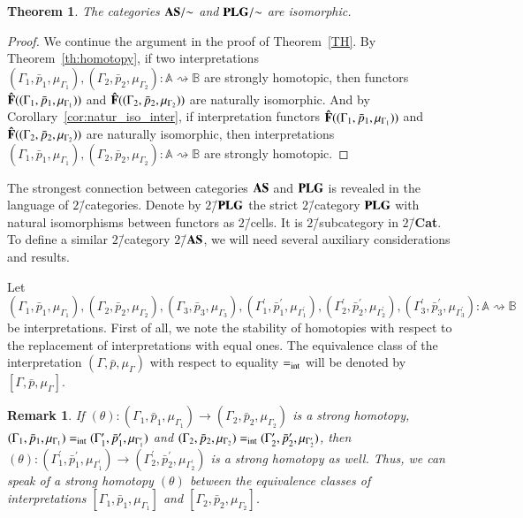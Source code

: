 \documentclass[12pt]{article}
\newtheorem{theorem}{Theorem}
\newtheorem{remark}{Remark}
\theoremstyle{definition}
\def\MA{{\mathbb{A}}}
\def\MB{{\mathbb{B}}}
\begin{document}
\begin{theorem}\label{TH_sim}
    The categories ${\bf AS}/{\sim}$ and ${\bf PLG}/{\sim}$ are isomorphic.
\end{theorem}

\begin{proof}
We continue the argument in the proof of Theorem~\ref{TH}. By Theorem~\ref{th:homotopy}, if two interpretations $(\Gamma_1,\bar p_1,\mu_{\Gamma_1}),(\Gamma_2,\bar p_2,\mu_{\Gamma_2})\colon \MA\rightsquigarrow\MB$ are strongly homotopic, then 
functors ${\bf \hat F}((\Gamma_1,\bar p_1,\mu_{\Gamma_1}))$ and ${\bf \hat F}((\Gamma_2,\bar p_2,\mu_{\Gamma_2}))$ are naturally isomorphic. And by Corollary~\ref{cor:natur_iso_inter}, if interpretation functors ${\bf \hat F}((\Gamma_1,\bar p_1,\mu_{\Gamma_1}))$ and ${\bf \hat F}((\Gamma_2,\bar p_2,\mu_{\Gamma_2}))$ are naturally isomorphic, then interpretations $(\Gamma_1,\bar p_1,\mu_{\Gamma_1}),(\Gamma_2,\bar p_2,\mu_{\Gamma_2})\colon \MA\rightsquigarrow\MB$ are strongly homotopic.
\end{proof}

The strongest connection between categories ${\bf AS}$ and ${\bf PLG}$ is revealed in the language of $2$\=/categories. Denote by $2$\=/${\bf PLG}$ the strict $2$\=/category ${\bf PLG}$ with natural isomorphisms between functors as $2$\=/cells. It is $2$\=/subcategory in $2$\=/{\bf Cat}. To define a similar $2$\=/category $2$\=/${\bf AS}$, we will need several auxiliary considerations and results.

Let $(\Gamma_1,\bar p_1,\mu_{\Gamma_1}),(\Gamma_2,\bar p_2,\mu_{\Gamma_2}), (\Gamma_3,\bar p_3,\mu_{\Gamma_3}), (\Gamma^\prime_1,\bar p^\prime_1,\mu_{\Gamma^\prime_1}), (\Gamma^\prime_2,\bar p^\prime_2,\mu_{\Gamma^\prime_2}),(\Gamma^\prime_3,\bar p^\prime_3,\mu_{\Gamma^\prime_3})\colon \MA\rightsquigarrow\MB$ be interpretations. First of all, we note the stability of homotopies with respect to the replacement of interpretations with equal ones. The equivalence class of the interpretation $(\Gamma,\bar p,\mu_\Gamma)$ with respect to equality $=_{\rm int}$ will be denoted by $[\Gamma,\bar p,\mu_\Gamma]$.

\begin{remark}\label{remark:hom_eq}
If $(\theta)\colon (\Gamma_1,\bar p_1,\mu_{\Gamma_1})\to (\Gamma_2,\bar p_2,\mu_{\Gamma_2})$ is a strong homotopy, $(\Gamma_1,\bar p_1,\mu_{\Gamma_1})=_{\rm int}(\Gamma^\prime_1,\bar p^\prime_1,\mu_{\Gamma^\prime_1})$ and $(\Gamma_2,\bar p_2,\mu_{\Gamma_2})=_{\rm int}(\Gamma^\prime_2,\bar p^\prime_2,\mu_{\Gamma^\prime_2})$, then $(\theta)\colon (\Gamma^\prime_1,\bar p^\prime_1,\mu_{\Gamma^\prime_1})\to (\Gamma^\prime_2,\bar p^\prime_2,\mu_{\Gamma^\prime_2})$ is a strong homotopy as well. Thus, we can speak of a strong homotopy $(\theta)$ between the equivalence classes of interpretations $[\Gamma_1,\bar p_1,\mu_{\Gamma_1}]$ and $[\Gamma_2,\bar p_2,\mu_{\Gamma_2}]$.
\end{remark}
\end{document}
